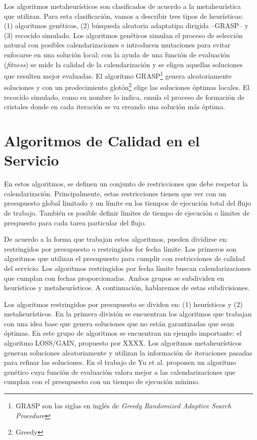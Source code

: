 Los algoritmos metaheurísticos son clasificados de acuerdo a la metaheurística que utilizan. Para esta clasificación, vamos a describir tres tipos de heurísticas: (1) algoritmos genéticos, (2) búsqueda aleatoria adaptatipa dirigida --GRASP-- y (3) recocido simulado. Los algoritmos genéticos simulan el proceso de selección natural con posibles calendarizaciones e introducen mutaciones para evitar enfocarse en una solución local; con la ayuda de una función de evaluación (\emph{fitness}) se mide la calidad de la calendarización y se eligen aquellas soluciones que resulten mejor evaluadas. El algoritmo GRASP\footnote{GRASP son las siglas en inglés de \emph{Greedy Randomized Adaptive Search Procedure}} genera aleatoriamente soluciones y con un prodecimiento glotón\footnote{Greedy} elige las soluciones óptimas locales. El recocido simulado, como su nombre lo indica, emula el proceso de formación de cristales donde en cada iteración se va creando una solución más óptima.

\section{Algoritmos de Calidad en el Servicio}
En estos algoritmos, se definen un conjunto de restricciones que debe respetar la calendarización. Principalmente, estas restricciones tienen que ver con un presupuesto global limitado y un límite en los tiempos de ejecución total del flujo de trabajo. También es posible definir límites de tiempo de ejecución o límites de prespuesto para cada tarea particular del flujo.

De acuerdo a la forma que trabajan estos algoritmos, pueden dividirse en: restringidos por presupuesto o restringidos for fecha límite. Los primeros son algoritmos que utilizan el presupuesto para cumplir con restricciones de calidad del servicio. Los algoritmos restringidos por fecha límite buscan calendarizaciones que cumplan con fechas proporcionadas. Ambos grupos se subdividen en heurísticos y metaheurísticos. A continuación, hablaremos de estas subdivisiones.

Los algoritmos restringidos por presupuesto se dividen en: (1) heurísticos y (2) metaheurísticos. En la primera división se encuentran los algoritmos que trabajan con una idea base que genera soluciones que no están garantizadas que sean óptimas. En este grupo de algoritmos se encuentran un ejemplo importante: el algoritmo LOSS/GAIN, propuesto por XXXX. Los algoritmos metaheurísticos generan soluciones aleatoriamente y utilizan la información de iteraciones pasadas para refinar las soluciones. En el trabajo de Yu et al. \cite{yu2006scheduling} proponen un algoritmo genético cuya función de evaluación valora mejor a las calendarizaciones que cumplan con el presupuesto con un tiempo de ejecución mínimo.

